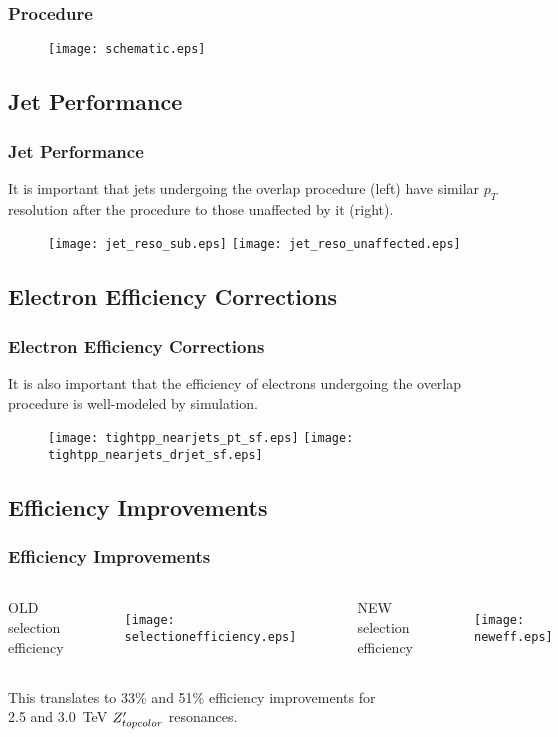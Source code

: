 \begin{frame}
    \frametitle{Procedure}
\begin{figure}
\centering
\texttt{[image: schematic.eps]}
\end{figure}
\end{frame}

\subsection{Jet Performance}

\begin{frame}
    \frametitle{Jet Performance}
It is important that jets undergoing the overlap procedure (left) have
similar $p_T$ resolution after the procedure to those unaffected by it
(right).
\begin{figure}
\centering
\texttt{[image: jet\_reso\_sub.eps]}
\texttt{[image: jet\_reso\_unaffected.eps]}
\end{figure}
\end{frame}

\subsection{Electron Efficiency Corrections}

\begin{frame}
    \frametitle{Electron Efficiency Corrections}
It is also important that the efficiency of electrons undergoing the
overlap procedure is well-modeled by simulation.
\begin{figure}
\centering
\texttt{[image: tightpp\_nearjets\_pt\_sf.eps]}
\texttt{[image: tightpp\_nearjets\_drjet\_sf.eps]}
\end{figure}
\end{frame}

\subsection{Efficiency Improvements}

\begin{frame}
    \frametitle{Efficiency Improvements}
\begin{columns}
\centering
OLD selection efficiency
\begin{figure}
\texttt{[image: selectionefficiency.eps]}
\end{figure}
\centering
NEW selection efficiency
\begin{figure}
\texttt{[image: neweff.eps]}
\end{figure}
\end{columns}

\centering
\vspace{15pt}
This translates to 33\% and 51\% efficiency improvements for \\
2.5 and 3.0~TeV $Z^\prime_{topcolor}$ resonances.
\end{frame}
